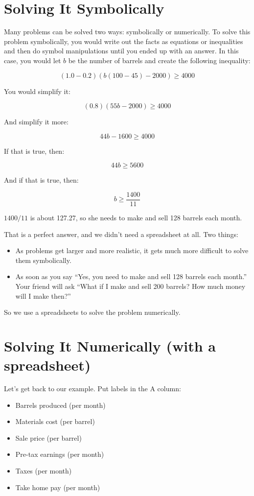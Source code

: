 \section{Solving It Symbolically}

Many problems can be solved two ways: symbolically or
numerically. To solve this
problem symbolically, you would write out the facts as equations or
inequalities and then do symbol manipulations until you ended up with
an answer. In this case, you would let $b$ be the number of barrels
and create the following inequality:

$$(1.0 - 0.2)\left(b(100 - 45) - 2000\right) \geq 4000$$

You would simplify it:

$$(0.8)\left(55 b - 2000\right) \geq 4000$$

And simplify it more:

$$44b - 1600 \geq 4000$$

If that is true, then:

$$44b \geq 5600$$

And if that is true, then:

$$b \geq \frac{1400}{11}$$

$1400/11$ is about 127.27, so she needs to make and sell 128 barrels
each month.

That is a perfect answer, and we didn't need a spreadsheet at all. Two things:
\begin{itemize}
\item As problems get larger and more realistic, it gets much more difficult to solve them symbolically.
\item As soon as you say ``Yes, you need to make and sell 128 barrels
  each month.'' Your friend will ask ``What if I make and sell 200
  barrels? How much money will I make then?''
\end{itemize}

So we use a spreadsheets to solve the problem numerically.

\section{Solving It Numerically (with a spreadsheet)}


Let's get back to our example. Put labels in the A column:
\begin{itemize}
\item{Barrels produced (per month)}
\item{Materials cost (per barrel)}
\item{Sale price (per barrel)}
\item{Pre-tax earnings (per month)}
\item{Taxes (per month)}
\item{Take home pay (per month)}
\end{itemize}

